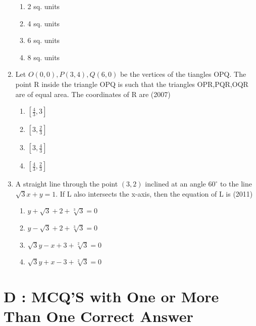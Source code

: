 \documentclass[12pt]{article}
\begin{document}
\begin{enumerate}
\begin{enumerate}
\item 2 sq. units  
\item 4 sq. units 
\item 6 sq. units    
\item 8 sq. units
\end{enumerate}
\item Let $O(0,0),P(3,4),Q(6,0)$ be the vertices of the tiangles OPQ. The point R inside the triangle OPQ is such that the triangles OPR,PQR,OQR are of equal area. The coordinates of R are   (2007)
\begin{enumerate}
\item $[\frac{4}{3}, 3]$   
\item $[3,\frac{2}{3}]$  
\item $[3,\frac{4}{3}]$  
\item $[\frac{4}{3},\frac{2}{3}]$
\end{enumerate}
\item A straight line through the point $(3,2)$ inclined at an angle $60^\circ$  to the line $\sqrt{3}x+y=1$. If L also intersects the x-axis, then the equation of L is   (2011)
\begin{enumerate}
\item $y+\sqrt{3}+2+\sqrt[3]{3}=0$
\item $y-\sqrt{3}+2+\sqrt[3]{3}=0$ 
\item $\sqrt{3}y-x+3+\sqrt[2]{3}=0$  
\item $\sqrt{3}y+x-3+\sqrt[2]{3}=0$
\end{enumerate}
\end{enumerate}
\section*{D  :  MCQ'S with One or More Than One Correct Answer}
\end{document}

